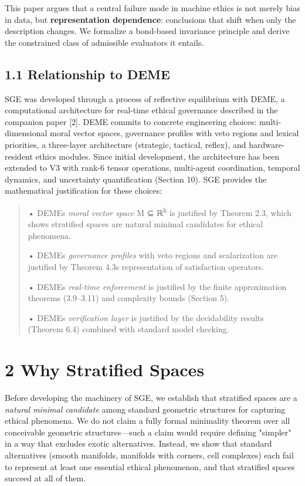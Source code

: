 \documentclass[12pt]{article}
\theoremstyle{plain}
\theoremstyle{definition}
\theoremstyle{remark}
\begin{document}
This paper argues that a central failure mode in machine ethics is not
merely bias in data, but \textbf{representation dependence}: conclusions
that shift when only the description changes. We formalize a bond-based
invariance principle and derive the constrained class of admissible
evaluators it entails.

\subsection{1.1 Relationship to DEME}\label{relationship-to-deme}

SGE was developed through a process of reflective equilibrium with DEME,
a computational architecture for real-time ethical governance
described in the companion paper {[}2{]}. DEME commits to concrete
engineering choices: multi-dimensional moral vector spaces, governance
profiles with veto regions and lexical priorities, a three-layer
architecture (strategic, tactical, reflex), and hardware-resident ethics
modules. Since initial development, the architecture has been extended
to V3 with rank-6 tensor operations, multi-agent coordination, temporal
dynamics, and uncertainty quantification (Section 10). SGE provides the
mathematical justification for these choices:

\begin{quote}
• DEME\textquotesingle s \emph{moral vector space} M ⊆
ℝ\textsuperscript{k} is justified by Theorem 2.3, which shows stratified
spaces are natural minimal candidates for ethical phenomena.

• DEME\textquotesingle s \emph{governance profiles} with veto regions
and scalarization are justified by Theorem 4.3\textquotesingle s
representation of satisfaction operators.

• DEME\textquotesingle s \emph{real-time enforcement} is justified by
the finite approximation theorems (3.9--3.11) and complexity bounds
(Section 5).

• DEME\textquotesingle s \emph{verification layer} is justified by the
decidability results (Theorem 6.4) combined with standard model
checking.
\end{quote}

\section{2 Why Stratified Spaces}\label{why-stratified-spaces}

Before developing the machinery of SGE, we establish that stratified
spaces are a \emph{natural minimal candidate} among standard geometric
structures for capturing ethical phenomena. We do not claim a fully
formal minimality theorem over all conceivable geometric
structures---such a claim would require defining "simpler" in a way that
excludes exotic alternatives. Instead, we show that standard
alternatives (smooth manifolds, manifolds with corners, cell complexes)
each fail to represent at least one essential ethical phenomenon, and
that stratified spaces succeed at all of them.
\end{document}

